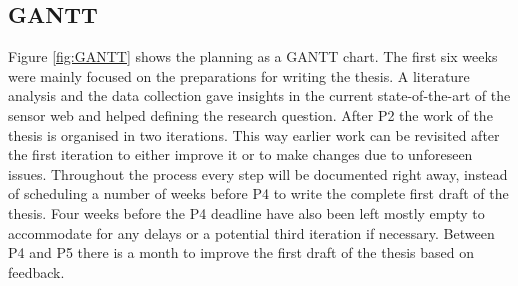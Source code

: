 \subsection{GANTT}
Figure \ref{fig:GANTT} shows the planning as a GANTT chart. The first six weeks were mainly focused on the preparations for writing the thesis. A literature analysis and the data collection gave insights in the current state-of-the-art of the sensor web and helped defining the research question. After P2 the work of the thesis is organised in two iterations. This way earlier work can be revisited after the first iteration to either improve it or to make changes due to unforeseen issues. Throughout the process every step will be documented right away, instead of scheduling a number of weeks before P4 to write the complete first draft of the thesis. Four weeks before the P4 deadline have also been left mostly empty to accommodate for any delays or a potential third iteration if necessary. Between P4 and P5 there is a month to improve the first draft of the thesis based on feedback.     

